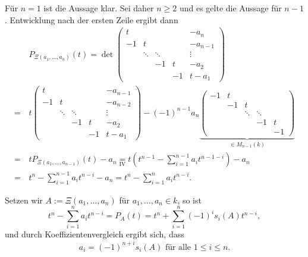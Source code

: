 \documentclass[a4paper,10pt]{article}
\begin{document}
Für $n=1$ ist die Aussage klar. Sei daher $n \geq 2$ und es gelte die Aussage für $n-1$. Entwicklung nach der ersten Zeile ergibt dann
\begin{align*}
  &\, P_{\Xi(a_1, \ldots, a_n)}(t)
 = \det
 \begin{pmatrix}
   t &        &        &    &  -a_n     \\
  -1 &      t &        &    &  -a_{n-1} \\
     & \ddots & \ddots &    &   \vdots  \\
     &        &     -1 &  t &  -a_2     \\
     &        &        & -1 & t-a_1
 \end{pmatrix} \\
 =&\, t
  \begin{pmatrix}
   t &        &        &    &  -a_{n-1} \\
  -1 &      t &        &    &  -a_{n-2} \\
     & \ddots & \ddots &    &   \vdots  \\
     &        &     -1 &  t &  -a_2     \\
     &        &        & -1 & t-a_1
 \end{pmatrix}
 - (-1)^{n-1} a_n
 \underbrace{\begin{pmatrix}
  -1 &  t &        &        &    \\
     & -1 & t      &        &    \\
     &    & \ddots & \ddots &    \\
     &    &        &     -1 &  t \\
     &    &        &        & -1
 \end{pmatrix}}_{\in M_{n-1}(k)} \\
 =&\, t P_{\Xi(a_1, \ldots, a_{n-1})}(t) - a_n
 \underset{\text{IV}}= t\left( t^{n-1} - \sum_{i=1}^{n-1} a_i t^{n-1-i} \right) - a_n \\
 =&\, t^n - \sum_{i=1}^{n-1} a_i t^{n-i} - a_n
 = t^n - \sum_{i=1}^n a_i t^{n-i}.
\end{align*}

Setzen wir $A := \Xi(a_1, \ldots, a_n)$ für $a_1, \ldots, a_n \in k$, so ist
\[
 t^n - \sum_{i=1}^n a_i t^{n-i} = P_A(t) = t^n + \sum_{i=1}^n (-1)^i s_i(A) t^{n-i},
\]
und durch Koeffizientenvergleich ergibt sich, dass
\[
 a_i = (-1)^{n+i} s_i(A) \text{ für alle } 1 \leq i \leq n.
\]
\end{document}
